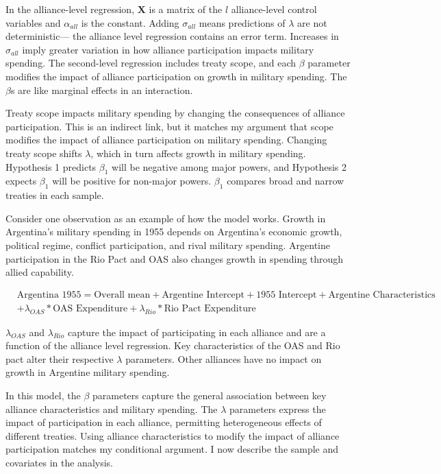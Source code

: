 \documentclass[12pt]{article}
\begin{document}
In the alliance-level regression, $\textbf{X}$ is a matrix of the $l$ alliance-level control variables and $\alpha_{all}$ is the constant.
Adding $\sigma_{all}$ means predictions of $\lambda$ are not deterministic--- the alliance level regression contains an error term. 
Increases in $\sigma_{all}$ imply greater variation in how alliance participation impacts military spending. 
The second-level regression includes treaty scope, and each $\beta$ parameter modifies the impact of alliance participation on growth in military spending. 
The $\beta$s are like marginal effects in an interaction. 


Treaty scope impacts military spending by changing the consequences of alliance participation.
This is an indirect link, but it matches my argument that scope modifies the impact of alliance participation on military spending.  
Changing treaty scope shifts $\lambda$, which in turn affects growth in military spending.
Hypothesis 1 predicts $\beta_1$ will be negative among major powers, and Hypothesis 2 expects $\beta_1$ will be positive for non-major powers.
$\beta_1$ compares broad and narrow treaties in each sample. 


Consider one observation as an example of how the model works. 
Growth in Argentina's military spending in 1955 depends on Argentina's economic growth, political regime, conflict participation, and rival military spending. 
Argentine participation in the Rio Pact and OAS also changes growth in spending through allied capability. 


\begin{equation}
\begin{split}
& \mbox{Argentina 1955} = \mbox{Overall mean}
+ \mbox{Argentine Intercept} + \mbox{1955 Intercept} 
+ \mbox{Argentine Characteristics} \\
& + \lambda_{OAS} * \mbox{OAS Expenditure} + \lambda_{Rio} * \mbox{Rio Pact Expenditure}
\end{split} 
\end{equation}


$\lambda_{OAS}$ and $\lambda_{Rio}$ capture the impact of participating in each alliance and are a function of the alliance level regression. 
Key characteristics of the OAS and Rio pact alter their respective $\lambda$ parameters.
Other alliances have no impact on growth in Argentine military spending. 


In this model, the $\beta$ parameters capture the general association between key alliance characteristics and military spending. 
The $\lambda$ parameters express the impact of participation in each alliance, permitting heterogeneous effects of different treaties. 
Using alliance characteristics to modify the impact of alliance participation matches my conditional argument. 
I now describe the sample and covariates in the analysis.  
\end{document}
